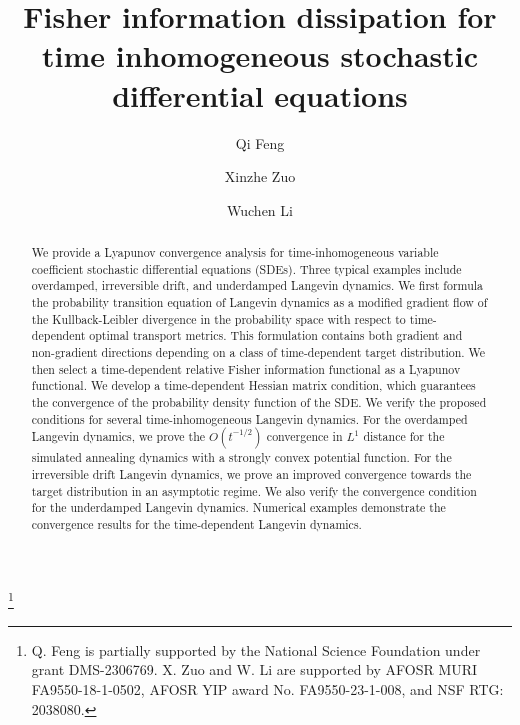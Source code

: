 \documentclass[11pt,reqno]{amsart}
\begin{document}
\title[Time dependent information dissipation]{Fisher information dissipation for time inhomogeneous stochastic differential equations}
\author[Feng]{Qi Feng}
\address{Department of Mathematics, Florida State University, Tallahassee, FL 32306.}
\author[Zuo]{Xinzhe Zuo}
\address{Department of Mathematics, University of California, Los Angeles, CA 90095.}
\author[Li]{Wuchen Li}
\address{Department of Mathematics, University of South Carolina, Columbia, SC 29208.}
\thanks{Q. Feng is partially supported by the National Science Foundation under grant DMS-2306769. X. Zuo and W. Li are supported by AFOSR MURI FA9550-18-1-0502, AFOSR YIP award No. FA9550-23-1-008, and NSF RTG: 2038080.}

\begin{abstract}
We provide a Lyapunov convergence analysis for time-inhomogeneous variable coefficient stochastic differential equations (SDEs). Three typical examples include overdamped, irreversible drift, and underdamped Langevin dynamics. We first formula the probability transition equation of Langevin dynamics as a modified gradient flow of the Kullback-Leibler divergence in the probability space with respect to time-dependent optimal transport metrics. This formulation contains both gradient and non-gradient directions depending on a class of time-dependent target distribution. We then select a time-dependent relative Fisher information functional as a Lyapunov functional. We develop a time-dependent Hessian matrix condition, which guarantees the convergence of the probability density function of the SDE. We verify the proposed conditions for several time-inhomogeneous Langevin dynamics. For the overdamped Langevin dynamics, we prove the $O(t^{-1/2})$ convergence in $L^1$ distance for the simulated annealing dynamics with a strongly convex potential function. For the irreversible drift Langevin dynamics, we prove an improved convergence towards the target distribution in an asymptotic regime. We also verify the convergence condition for the underdamped Langevin dynamics. Numerical examples demonstrate the convergence results for the time-dependent Langevin dynamics.
\end{abstract}

\maketitle
\end{document}
